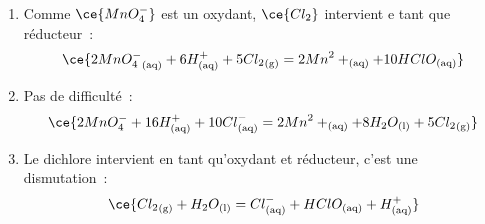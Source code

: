 \documentclass[a4paper, 10pt, final, garamond]{book}
\begin{document}
{\begin{enumerate}[label=\alph*)]
\[{			      }
		      \]
		\item Comme $\ce{MnO_4^{-}}$ est un oxydant, $\ce{Cl_2}$ intervient e tant
		      que réducteur~:
		      \[
			      \ce{2 {MnO_4^{-}}_{\rm(aq)} + 6 {H}^+_{\rm(aq)} + 5 {Cl_2}_{\rm(g)} =
			      2 {Mn}^2+_{\rm(aq)} + 10 HClO_{\rm(aq)}}
		      \]
		\item Pas de difficulté~:
		      \[
			      \ce{2 {MnO_4^{-}} + 16 {H}^+_{\rm(aq)} + 10 {Cl}^- _{\rm(aq)} =
			      2 {Mn}^2+_{\rm(aq)} + 8 H_2O_{\rm(l)} + 5 {Cl_2}_{\rm(g)}}
		      \]
		\item Le dichlore intervient en tant qu'oxydant et réducteur, c'est une
		      dismutation~:
		      \[
			      \ce{{Cl_2}_{\rm(g)} + H_2O_{\rm(l)} = {Cl}^-_{\rm(aq)} + HClO_{\rm(aq)}+
			      {H}^+_{\rm(aq)}}
		      \]
	\end{enumerate}
}%

\resetQ
\end{document}
